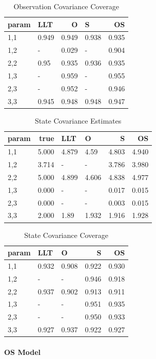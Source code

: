 \documentclass[
]{article}
\begin{document}
\begin{longtable}[t]{l|l|r|l|r}
\caption{\label{tab:unnamed-chunk-17}Observation Covariance Coverage}\\
\hline
param & LLT & O & S & OS\\
\hline
1,1 & 0.949 & 0.949 & 0.938 & 0.935\\
\hline
1,2 & - & 0.029 & - & 0.904\\
\hline
2,2 & 0.95 & 0.935 & 0.936 & 0.935\\
\hline
1,3 & - & 0.959 & - & 0.955\\
\hline
2,3 & - & 0.952 & - & 0.946\\
\hline
3,3 & 0.945 & 0.948 & 0.948 & 0.947\\
\hline
\end{longtable}

\begin{longtable}[t]{l|r|l|l|r|r}
\caption{\label{tab:unnamed-chunk-18}State Covariance Estimates}\\
\hline
param & true & LLT & O & S & OS\\
\hline
1,1 & 5.000 & 4.879 & 4.59 & 4.803 & 4.940\\
\hline
1,2 & 3.714 & - & - & 3.786 & 3.980\\
\hline
2,2 & 5.000 & 4.899 & 4.606 & 4.838 & 4.977\\
\hline
1,3 & 0.000 & - & - & 0.017 & 0.015\\
\hline
2,3 & 0.000 & - & - & 0.003 & 0.015\\
\hline
3,3 & 2.000 & 1.89 & 1.932 & 1.916 & 1.928\\
\hline
\end{longtable}

\begin{longtable}[t]{l|l|l|r|r}
\caption{\label{tab:unnamed-chunk-19}State Covariance Coverage}\\
\hline
param & LLT & O & S & OS\\
\hline
1,1 & 0.932 & 0.908 & 0.922 & 0.930\\
\hline
1,2 & - & - & 0.946 & 0.918\\
\hline
2,2 & 0.937 & 0.902 & 0.913 & 0.911\\
\hline
1,3 & - & - & 0.951 & 0.935\\
\hline
2,3 & - & - & 0.950 & 0.933\\
\hline
3,3 & 0.927 & 0.937 & 0.922 & 0.927\\
\hline
\end{longtable}

\hypertarget{os-model-1}{%
\paragraph{OS Model}\label{os-model-1}}
\end{document}
